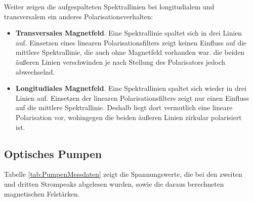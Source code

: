 \documentclass[../main.tex]{subfiles}
\begin{document}
    \noindent Weiter zeigen die aufgespalteten Spektrallinien bei longitudialem und transversalem ein anderes Polarisationsverhalten:
    \begin{itemize}
        \item \textbf{Transversales Magnetfeld}. Eine Spektrallinie spaltet sich in drei Linien auf. Einsetzen eines linearen Polarisationsfilters zeigt keinen Einfluss auf die mittlere Spektrallinie, die auch ohne Magnetfeld vorhanden war. die beiden äußeren Linien verschwinden je nach Stellung des Polarisators jedoch abwechselnd.\\
        \item \textbf{Longitudiales Magnetfeld}. Eine Spektrallinien spaltet sich wieder in drei Linien auf. Einsetzen der linearen Polarisationsfilters zeigt nur einen Einfluss auf die mittlere Spektrallinie. Deshalb liegt dort vermutlich eine lineare Polarisation vor, wohingegen die beiden äußeren Linien zirkular polarisiert ist.
    \end{itemize}

\subsection{Optisches Pumpen}
    Tabelle \ref{tab:PumpenMessdaten} zeigt die Spannungswerte, die bei den zweiten und dritten Strompeaks abgelesen wurden, sowie die daraus berechneten magnetischen Felstärken.
\end{document}
